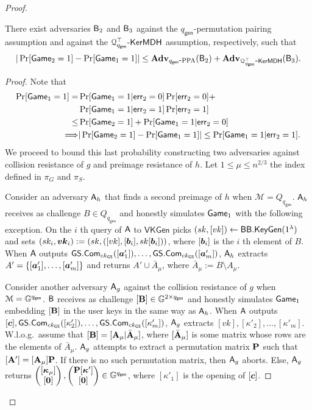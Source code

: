 \begin{proof}
\begin{lemma} There exist adversaries $\mathsf{B}_2$ and $\mathsf{B}_3$ against the ${q_\mathsf{gen}}$-permutation pairing assumption and against the $\mathcal{Q}^\top_{{q_\mathsf{gen}}}\mbox{-}\mathsf{KerMDH}$ assumption, respectively, such that
$$
|\Pr[\mathsf{Game}_2=1]-\Pr[\mathsf{Game}_1=1]|\leq \mathbf{Adv}_{{q_\mathsf{gen}}\mbox{-}\mathrm{PPA}}(\mathsf{B}_2)+\mathbf{Adv}_{\mathcal{Q}^\top_{{q_\mathsf{gen}}}\mbox{-}\mathsf{KerMDH}}(\mathsf{B}_3).
$$
\end{lemma}
\begin{proof}
Note that
\begin{align*}
\Pr[\mathsf{Game}_1=1]
 = &\Pr[\mathsf{Game}_1=1|\mathsf{err}_2=0]\Pr[\mathsf{err}_2=0]+\\
&\Pr[\mathsf{Game}_1=1|\mathsf{err}_2=1]\Pr[\mathsf{err}_2=1]\\
 \leq& \Pr[\mathsf{Game}_2=1] + \Pr[\mathsf{Game}_1=1|\mathsf{err}_2=0]\\
\Longrightarrow  &|\Pr[\mathsf{Game}_2=1]-\Pr[\mathsf{Game}_1=1]|\leq \Pr[\mathsf{Game}_1=1|\mathsf{err}_2=1].
\end{align*}
We proceed to bound this last probability constructing two adversaries against collision resistance of $g$ and preimage resistance of $h$. Let $1\leq \mu\leq n^{2/3}$ the index defined in $\pi_G$ and $\pi_S$.

Consider an adversary $\mathsf{A}_h$ that finds a second preimage of $h$ when $\mathcal{M}=Q_{q_\mathsf{gen}}$. $\mathsf{A}_h$ receives as challenge $B\in Q_{q_\mathsf{gen}}$ and honestly simulates $\mathsf{Game}_1$ with the following exception. On the $i$ th query of $\mathsf{A}$ to $\mathsf{VKGen}$ picks $(sk,[vk])\gets\mathsf{BB}.\mathsf{KeyGen}(1^\lambda)$ and sets $(sk_i,{\boldsymbol{vk}}_i):=(sk,([vk],[{\boldsymbol{b}}_i],sk[{\boldsymbol{b}}_i]))$, where $[{\boldsymbol{b}}_i]$ is the $i$ th element of $B$. When $\mathsf{A}$ outputs ${\mathsf{GS}}.\mathsf{Com}_{ck_{\mathsf{GS}}}([{\boldsymbol{a}}'_1]),\ldots,\allowbreak{\mathsf{GS}}.\mathsf{Com}_{ck_{\mathsf{GS}}}([{\boldsymbol{a}}'_m])$, $\mathsf{A}_h$ extracts $A'=\{[{\boldsymbol{a}}'_1],\ldots,[{\boldsymbol{a}}'_m]\}$ and returns $A'\cup \bar{A}_\mu$, where $\bar{A}_\mu:= B\setminus A_\mu$.

Consider another adversary $\mathsf{A}_g$ against the collision resistance of $g$ when $\mathcal{M}=\mathbb{G}^{q_\mathsf{gen}}$. $\mathsf{B}$ receives as challenge $[\mathbf{{B}}]\in\mathbb{G}^{2\times {q_\mathsf{gen}}}$ and honestly simulates $\mathsf{Game}_1$ embedding $[\mathbf{{B}}]$ in the user keys in the same way as $\mathsf{A}_h$. When $\mathsf{A}$ outputs $[{\boldsymbol{c}}],\allowbreak{\mathsf{GS}}.\mathsf{Com}_{ck_{\mathsf{GS}}}([\kappa'_2]),\ldots,\allowbreak{\mathsf{GS}}.\mathsf{Com}_{ck_{\mathsf{GS}}}([\kappa'_m])$, $\mathsf{A}_g$ extracts $[vk],[\kappa'_2],\ldots,[\kappa'_m]$. W.l.o.g.~\allowbreak assume that $[\mathbf{{B}}]=[\mathbf{{A}}_\mu|\bar{\mathbf{{A}}}_\mu]$, where $[\bar{\mathbf{{A}}}_\mu]$ is some matrix whose rows are the elements of $\bar{A}_\mu$. $\mathsf{A}_g$ attempts to extract a permutation matrix $\mathbf{{P}}$ such that  $[\mathbf{{A}}']=[\mathbf{{A}}_\mu]\mathbf{{P}}$. If there is no such permutation matrix, then $\mathsf{A}_g$ aborts. Else,  $\mathsf{A}_g$ returns
$\left(\begin{matrix}
	{[{\boldsymbol{\kappa}}_\mu]}\\
	{[{\boldsymbol{0}}]}\end{matrix}\right),
\left(\begin{matrix}
	{\mathbf{{P}}[{\boldsymbol{\kappa}}']}\\
	{[{\boldsymbol{0}}]}\end{matrix}\right)
\in\mathbb{G}^{q_\mathsf{gen}}$,
where $[\kappa'_1]$ is the opening of $[{\boldsymbol{c}}]$.


\end{proof}
\end{proof}
